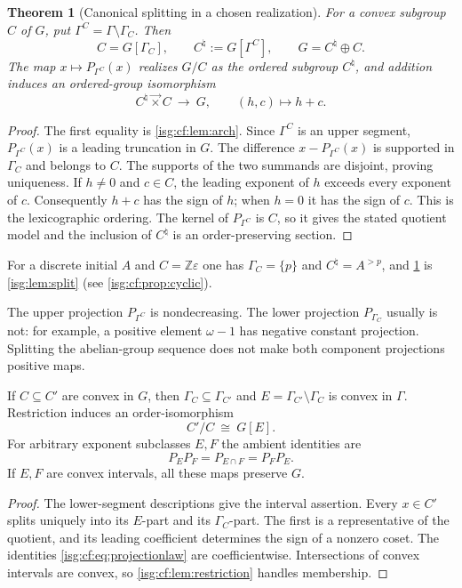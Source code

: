 \documentclass[11pt]{article}
\newtheorem{theorem}{Theorem}[section]
\theoremstyle{definition}
\theoremstyle{remark}
\newcommand{\Z}{\mathbb{Z}}
\newcommand{\lex}{\mathbin{\overrightarrow{\times}}}
\begin{document}
\begin{theorem}[Canonical splitting in a chosen realization]\label{isg:cf:thm:split}
For a convex subgroup $C$ of $G$, put $\Gamma^C=\Gamma\setminus\Gamma_C$.
Then
\[
 C=G[\Gamma_C],\qquad C^\natural:=G[\Gamma^C],\qquad G=C^\natural\oplus C.
\]
The map $x\mapsto P_{\Gamma^C}(x)$ realizes $G/C$ as the ordered subgroup
$C^\natural$, and addition induces an ordered-group isomorphism
\[
 C^\natural\lex C\ \longrightarrow\ G,\qquad (h,c)\longmapsto h+c.
\]
\end{theorem}
\begin{proof}
The first equality is \cref{isg:cf:lem:arch}. Since $\Gamma^C$ is an
upper segment, $P_{\Gamma^C}(x)$ is a leading truncation in $G$. The
difference $x-P_{\Gamma^C}(x)$ is supported in $\Gamma_C$ and belongs to
$C$. The supports of the two summands are disjoint, proving uniqueness.
If $h\ne0$ and $c\in C$, the leading exponent of $h$ exceeds every
exponent of $c$. Consequently $h+c$ has the sign of $h$; when $h=0$
it has the sign of $c$. This is the lexicographic ordering.
The kernel of $P_{\Gamma^C}$ is $C$, so it gives the stated quotient model
and the inclusion of $C^\natural$ is an order-preserving section.
\end{proof}

For a discrete initial $A$ and $C=\Z\varepsilon$ one has
$\Gamma_C=\{p\}$ and $C^\natural=A^{>p}$, and \cref{isg:cf:thm:split} is
\cref{isg:lem:split} (see \cref{isg:cf:prop:cyclic}).

\begin{remark}\label{isg:cf:rem:projection}
The upper projection $P_{\Gamma^C}$ is nondecreasing. The lower projection
$P_{\Gamma_C}$ usually is not: for example, a positive element
$\omega-1$ has negative constant projection. Splitting the abelian-group
sequence does not make both component projections positive maps.
\end{remark}

\begin{proposition}\label{isg:cf:prop:factorcoordinates}
If $C\subseteq C'$ are convex in $G$, then
$\Gamma_C\subseteq\Gamma_{C'}$ and $E=\Gamma_{C'}\setminus\Gamma_C$
is convex in $\Gamma$. Restriction induces an order-isomorphism
\[
 C'/C\ \cong\ G[E].
\]
For arbitrary exponent subclasses $E,F$ the ambient identities are
\begin{equation}\label{isg:cf:eq:projectionlaw}
 P_E P_F=P_{E\cap F}=P_F P_E.
\end{equation}
If $E,F$ are convex intervals, all these maps preserve $G$.
\end{proposition}
\begin{proof}
The lower-segment descriptions give the interval assertion. Every
$x\in C'$ splits uniquely into its $E$-part and its $\Gamma_C$-part.
The first is a representative of the quotient, and its leading
coefficient determines the sign of a nonzero coset. The identities
\eqref{isg:cf:eq:projectionlaw} are coefficientwise. Intersections of
convex intervals are convex, so \cref{isg:cf:lem:restriction} handles
membership.
\end{proof}
\end{document}
